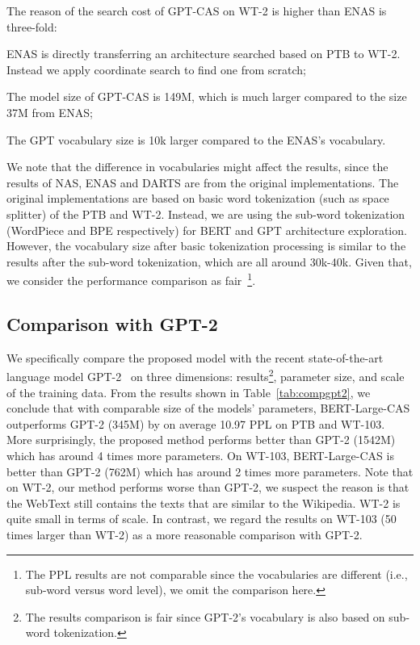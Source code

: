 \documentclass[11pt,a4paper]{article}
\begin{document}
The reason of the search cost of GPT-CAS on WT-2 is higher than ENAS
is three-fold: 
\begin{enumerate*}
\item ENAS is directly transferring an architecture searched based on PTB
to WT-2. Instead we apply coordinate search to find one from scratch; 
\item The model size of GPT-CAS is 149M, which is much larger compared to the size 37M from ENAS; 
\item The GPT vocabulary size is 10k larger compared to the ENAS's
  vocabulary.
\end{enumerate*}
We note that the difference in vocabularies might affect the results,
since the results of NAS, ENAS and DARTS are from the original
implementations. The original implementations are based on basic word tokenization (such as space splitter) of the PTB and WT-2. Instead, we
are using the sub-word tokenization (WordPiece and BPE respectively)
for BERT and GPT architecture exploration. However, the vocabulary
size after basic tokenization processing is similar to the results
after the sub-word tokenization, which are all around 30k-40k. Given
that, we consider the performance comparison as fair~\footnote{The PPL results are not comparable since the vocabularies are different (i.e., sub-word versus word level), we omit the comparison here.}.



\subsection{Comparison with GPT-2}

We specifically compare the proposed model with the recent state-of-the-art language model GPT-2~\cite{radford2019language} on three dimensions: results\footnote{The results comparison is fair since GPT-2's vocabulary is also based on sub-word tokenization.}, parameter size, and scale of the training data. From the results shown in Table~\ref{tab:compgpt2}, we conclude that with comparable size of the models' parameters, BERT-Large-CAS outperforms GPT-2 (345M) by on average {10.97} PPL on PTB and WT-103. More surprisingly, the proposed method performs better than GPT-2 (1542M) which has around 4 times more parameters. On WT-103, BERT-Large-CAS is better than GPT-2 (762M) which has around 2 times more parameters. Note that on WT-2, our method performs worse than GPT-2, we suspect the reason is that the WebText still contains the texts that are similar to the Wikipedia. WT-2 is quite small in terms of scale. In contrast, we regard the results on WT-103 (50 times larger than WT-2) as a more reasonable comparison with GPT-2. 
\end{document}
